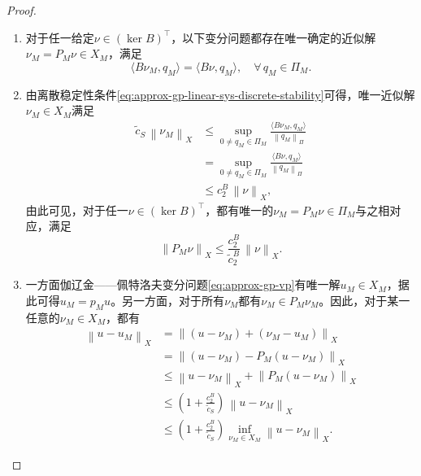 \begin{proof}
  \begin{enumerate}
  \item 对于任一给定$\nu \in \left( \ker B \right)^{\top}$，以下变分问题都存在唯一确定的近似解$\nu_{M} = P_{M} \nu \in X_{M}$，满足
  \begin{equation*}
    \langle B \nu_{M}, q_{M} \rangle = \langle B \nu, q_{M} \rangle, \quad \forall \, q_{M} \in \Pi_{M}.
  \end{equation*}

\item 由离散稳定性条件\eqref{eq:approx-gp-linear-sys-discrete-stability}可得，唯一近似解$\nu_{M} \in X_{M}$满足
\begin{equation*}
  \begin{split}
    \tilde{c}_{S} \, \left\| \nu_{M} \right\|_{X}
    & \le \sup_{0 \neq q_{M} \in \Pi_{M}}
    \frac{
    \langle B \nu_{M}, q_{M} \rangle
    }{
    \left\| q_{M} \right\|_{\Pi}
    } \\
    & = \sup_{0 \neq q_{M} \in \Pi_{M}}
    \frac{
    \langle B \nu, q_{M} \rangle
    }{
    \left\| q_{M} \right\|_{\Pi}
    } \\
    & \le c_{2}^{B} \, \left\| \nu \right\|_{X},
  \end{split}
\end{equation*}
由此可见，对于任一$\nu \in \left( \ker B \right)^{\top}$，都有唯一的$\nu_{M} = P_{M} \nu \in \Pi_{M}$与之相对应，满足
\begin{equation*}
  \left\| P_{M} \nu \right\|_{X} \le
  \frac{
  c_{2}^{B}
  }{
  \tilde{c}_{2}^{B}
  } \,
  \left\| \nu \right\|_{X}.
\end{equation*}

\item 一方面伽辽金——佩特洛夫变分问题\eqref{eq:approx-gp-vp}有唯一解$u_{M} \in X_{M}$，据此可得$u_{M} = p_{M} u$。另一方面，对于所有$\nu_{M}$都有$\nu_{M} \in P_{M} \nu_{M}$。因此，对于某一任意的$\nu_{M} \in X_{M}$，都有
\begin{equation*}
  \begin{split}
    \left\| u - u_{M} \right\|_{X}
    & = \left\|
    \left( u - \nu_{M} \right) + \left( \nu_{M} - u_{M} \right) \right\|_{X} \\
    & = \left\|
    \left( u - \nu_{M} \right) - P_{M} \left( u - \nu_{M} \right) \right\|_{X} \\
    & \le \left\| u - \nu_{M} \right\|_{X} +
    \left\| P_{M} \left( u - \nu_{M} \right) \right\|_{X} \\
    & \le \left( 1 + \frac{c_{2}^{B}}{\tilde{c}_{S}} \right)
    \, \left\| u - \nu_{M} \right\|_{X} \\
    & \le \left( 1 + \frac{c_{2}^{B}}{\tilde{c}_{S}} \right)
    \inf_{\nu_{M} \in X_{M}} \left\| u - \nu_{M} \right\|_{X}.
  \end{split}
\end{equation*}
\end{enumerate}
\end{proof}

